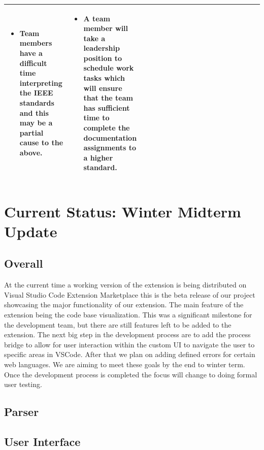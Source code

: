 \documentclass[letterpaper,10pt,titlepage,draftclsnofoot,onecolumn,onesided] {IEEEtran}
\begin{document}
\begin{center}
\begin{singlespace}
\begin{tabular}{ |  p{0.25\linewidth}  |  p{0.25\linewidth}  | p{0.25\linewidth} | p{0.25\linewidth} |}
\begin{itemize}
				\item Team members have a difficult time interpreting the IEEE standards and this may be a partial cause to the above.
			\end{itemize}
		&
			\begin{itemize}
				\item A team member will take a leadership position to schedule work tasks which will ensure that the team has sufficient time to complete the documentation assignments to a higher standard. 
			\end{itemize} 
		\\ \hline
		\end{tabular}
		\end{singlespace}
	\end{center}

\section{Current Status: Winter Midterm Update}
	
	\subsection{Overall}
	At the current time a working version of  the extension is being distributed on Visual Studio Code Extension Marketplace this is the beta release of our project showcasing the major functionality of our extension. 
	The main feature of the extension being the code base visualization. 
	This was a significant milestone for the development team, but there are still features left to be added to the extension. 
	The next big step in the development process are to add the process bridge to allow for user interaction within the custom UI to navigate the user to specific areas in VSCode.
	After that we plan on adding defined errors for certain web languages.
	We are aiming to meet these goals by the end to winter term. 
	Once the development process is completed the focus will change to doing formal user testing. 
	
	\subsection{Parser}

	\subsection{User Interface}
\end{document}
